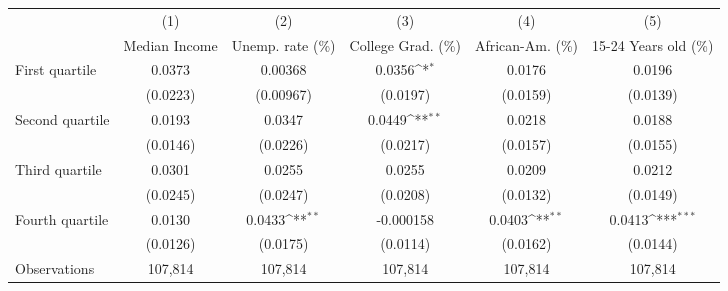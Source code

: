 {
\def\sym#1{\ifmmode^{#1}\else\(^{#1}\)\fi}
\begin{tabular}{l*{5}{c}}
\hline\hline
          &\multicolumn{1}{c}{(1)}&\multicolumn{1}{c}{(2)}&\multicolumn{1}{c}{(3)}&\multicolumn{1}{c}{(4)}&\multicolumn{1}{c}{(5)}\\
          &\multicolumn{1}{c}{Median Income}&\multicolumn{1}{c}{Unemp. rate (\%)}&\multicolumn{1}{c}{College Grad. (\%)}&\multicolumn{1}{c}{African-Am. (\%)}&\multicolumn{1}{c}{15-24 Years old (\%)}\\
\hline
First quartile&   0.0373         &  0.00368         &   0.0356\sym{*}  &   0.0176         &   0.0196         \\
          & (0.0223)         &(0.00967)         & (0.0197)         & (0.0159)         & (0.0139)         \\
[1em]
Second quartile&   0.0193         &   0.0347         &   0.0449\sym{**} &   0.0218         &   0.0188         \\
          & (0.0146)         & (0.0226)         & (0.0217)         & (0.0157)         & (0.0155)         \\
[1em]
Third quartile&   0.0301         &   0.0255         &   0.0255         &   0.0209         &   0.0212         \\
          & (0.0245)         & (0.0247)         & (0.0208)         & (0.0132)         & (0.0149)         \\
[1em]
Fourth quartile&   0.0130         &   0.0433\sym{**} &-0.000158         &   0.0403\sym{**} &   0.0413\sym{***}\\
          & (0.0126)         & (0.0175)         & (0.0114)         & (0.0162)         & (0.0144)         \\
\hline
Observations&  107,814         &  107,814         &  107,814         &  107,814         &  107,814         \\
\hline\hline
\end{tabular}
}
